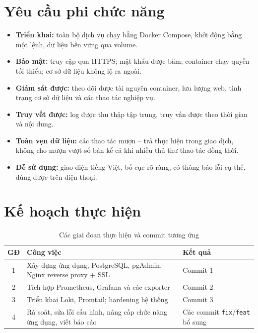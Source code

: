 \documentclass[../main.tex]{subfiles}
\begin{document}
\section{Yêu cầu phi chức năng}
\begin{itemize}
    \item \textbf{Triển khai:} toàn bộ dịch vụ chạy bằng Docker Compose, khởi động bằng một lệnh, dữ liệu bền vững qua volume.
    \item \textbf{Bảo mật:} truy cập qua HTTPS; mật khẩu được băm; container chạy quyền tối thiểu; cơ sở dữ liệu không lộ ra ngoài.
    \item \textbf{Giám sát được:} theo dõi được tài nguyên container, lưu lượng web, tình trạng cơ sở dữ liệu và các thao tác nghiệp vụ.
    \item \textbf{Truy vết được:} log được thu thập tập trung, truy vấn được theo thời gian và nội dung.
    \item \textbf{Toàn vẹn dữ liệu:} các thao tác mượn -- trả thực hiện trong giao dịch, không cho mượn vượt số bản kể cả khi nhiều thủ thư thao tác đồng thời.
    \item \textbf{Dễ sử dụng:} giao diện tiếng Việt, bố cục rõ ràng, có thông báo lỗi cụ thể, dùng được trên điện thoại.
\end{itemize}

\section{Kế hoạch thực hiện}
\begin{table}[H]
\centering
\caption{Các giai đoạn thực hiện và commit tương ứng}
\label{tab:ke-hoach}
\begin{tabular}{|c|p{6.5cm}|p{6cm}|}
\hline
\textbf{GĐ} & \textbf{Công việc} & \textbf{Kết quả} \\
\hline
1 & Xây dựng ứng dụng, PostgreSQL, pgAdmin, Nginx reverse proxy + SSL & Commit 1 \\ \hline
2 & Tích hợp Prometheus, Grafana và các exporter & Commit 2 \\ \hline
3 & Triển khai Loki, Promtail; hardening hệ thống & Commit 3 \\ \hline
4 & Rà soát, sửa lỗi cấu hình, nâng cấp chức năng ứng dụng, viết báo cáo & Các commit \texttt{fix}/\texttt{feat} bổ sung \\ \hline
\end{tabular}
\end{table}
\end{document}
